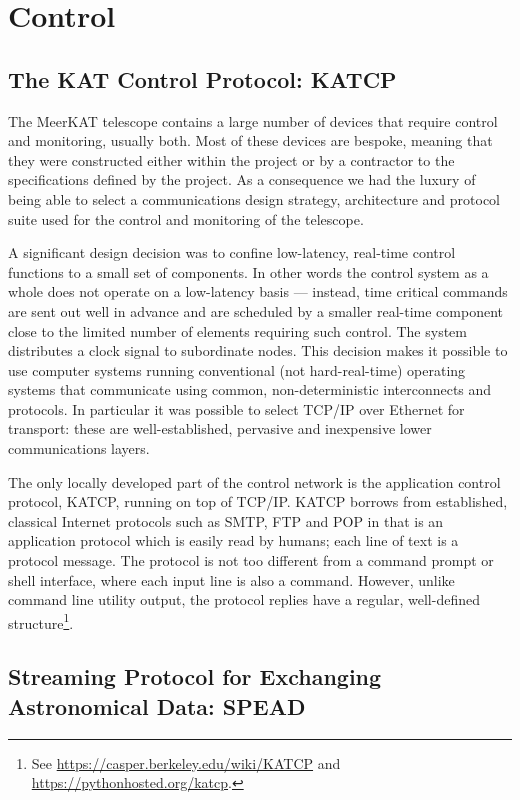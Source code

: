 \section{Control}
\label{sec:control}

\subsection{The KAT Control Protocol: KATCP}
\label{sec:KATCP}

\noindent
The MeerKAT telescope contains a large number of devices that require
control and monitoring, usually both. Most of these devices are
bespoke, meaning that they were constructed either within the project
or by a contractor to the specifications defined by the project.  As a
consequence we had the luxury of being able to select a communications
design strategy, architecture and protocol suite used for the control
and monitoring of the telescope.

A significant design decision was to confine low-latency, real-time
control functions to a small set of components. In other words the
control system as a whole does not operate on a low-latency basis ---
instead, time critical commands are sent out well in advance and are
scheduled by a smaller real-time component close to the limited number
of elements requiring such control. The system distributes a clock
signal to subordinate nodes.  This decision makes it possible to use
computer systems running conventional (not hard-real-time) operating
systems that communicate using common, non-deterministic interconnects
and protocols. In particular it was possible to select TCP/IP over
Ethernet for transport: these are well-established, pervasive and
inexpensive lower communications layers.

The only locally developed part of the control network is the
application control protocol, KATCP, running on top
of TCP/IP\@. KATCP borrows from established, classical Internet
protocols such as SMTP, FTP and POP in that is an application protocol
which is easily read by humans; each line of text is a protocol
message. The protocol is not too different from a
command prompt or shell interface, where each input line is also a
command. However, unlike command line utility output, the protocol
replies have a regular, well-defined structure\footnote{See
\url{https://casper.berkeley.edu/wiki/KATCP}
 and \url{https://pythonhosted.org/katcp}.
}.


\subsection{Streaming Protocol for Exchanging Astronomical Data: SPEAD}

